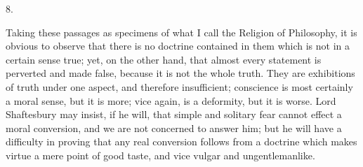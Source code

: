 8.

Taking these passages as specimens of what I call the Religion of
Philosophy, it is obvious to observe that there is no doctrine
contained in them which is not in a certain sense true; yet, on the
other hand, that almost every statement is perverted and made false,
because it is not the whole truth. They are exhibitions of truth under
one aspect, and therefore insufficient; conscience is most certainly a
moral sense, but it is more; vice again, is a deformity, but it is
worse. Lord Shaftesbury may insist, if he will, that simple and
solitary fear cannot effect a moral conversion, and we are not
concerned to answer him; but he will have a difficulty in
proving that any real conversion follows from a doctrine which makes
virtue a mere point of good taste, and vice vulgar and ungentlemanlike.

